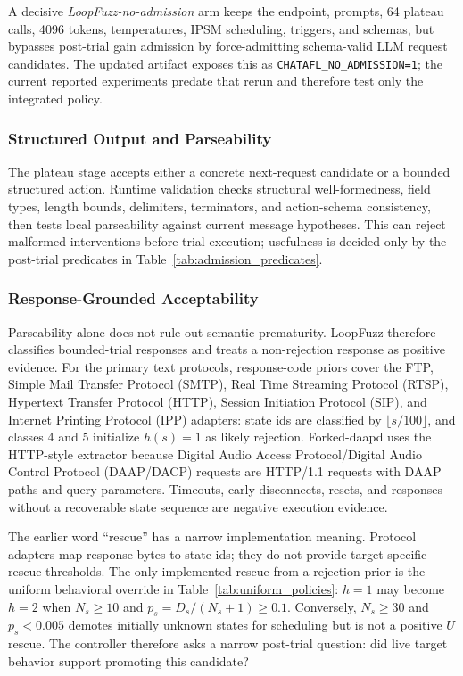\documentclass[final,5p,times,number]{elsarticle}
\begin{document}
A decisive \emph{LoopFuzz-no-admission} arm keeps the endpoint, prompts, 64 plateau calls, 4096 tokens, temperatures, IPSM scheduling, triggers, and schemas, but bypasses post-trial gain admission by force-admitting schema-valid LLM request candidates. The updated artifact exposes this as \texttt{CHATAFL\_NO\_ADMISSION=1}; the current reported experiments predate that rerun and therefore test only the integrated policy.

\subsubsection{Structured Output and Parseability}
The plateau stage accepts either a concrete next-request candidate or a bounded structured action. Runtime validation checks structural well-formedness, field types, length bounds, delimiters, terminators, and action-schema consistency, then tests local parseability against current message hypotheses. This can reject malformed interventions before trial execution; usefulness is decided only by the post-trial predicates in Table~\ref{tab:admission_predicates}.

\subsubsection{Response-Grounded Acceptability}
Parseability alone does not rule out semantic prematurity. LoopFuzz therefore classifies bounded-trial responses and treats a non-rejection response as positive evidence. For the primary text protocols, response-code priors cover the FTP, Simple Mail Transfer Protocol (SMTP), Real Time Streaming Protocol (RTSP), Hypertext Transfer Protocol (HTTP), Session Initiation Protocol (SIP), and Internet Printing Protocol (IPP) adapters: state ids are classified by $\lfloor s/100\rfloor$, and classes 4 and 5 initialize $h(s)=1$ as likely rejection. Forked-daapd uses the HTTP-style extractor because Digital Audio Access Protocol/Digital Audio Control Protocol (DAAP/DACP) requests are HTTP/1.1 requests with DAAP paths and query parameters. Timeouts, early disconnects, resets, and responses without a recoverable state sequence are negative execution evidence.

The earlier word ``rescue'' has a narrow implementation meaning. Protocol adapters map response bytes to state ids; they do not provide target-specific rescue thresholds. The only implemented rescue from a rejection prior is the uniform behavioral override in Table~\ref{tab:uniform_policies}: $h=1$ may become $h=2$ when $N_s\ge10$ and $p_s=D_s/(N_s+1)\ge0.1$. Conversely, $N_s\ge30$ and $p_s<0.005$ demotes initially unknown states for scheduling but is not a positive $U$ rescue. The controller therefore asks a narrow post-trial question: did live target behavior support promoting this candidate?
\end{document}
